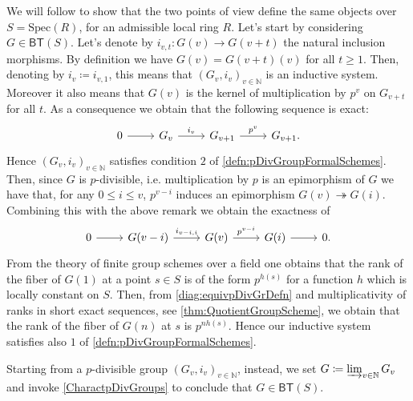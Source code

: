 \begin{rem}
	We will follow \cite[Chapter I, \S2, remark 2.3 and 
	Chapter II, \S3, theorem 2.1.7]{Messing} to show that
	the two points of view define the same objects over $S = \mathrm{Spec}(R)$,
	for an admissible local ring $R$.
	Let's start by considering $G \in \mathsf{BT}(S)$.
	Let's denote by $i_{v,t}\colon G(v) \to G(v+t)$ the natural inclusion
	morphisms.
	By definition we have $G(v) = G(v+t)(v)$ for all $t \geq 1$.
	Then, denoting by $i_v \coloneqq i_{v,1}$, this means that
	$\left( G_v, i_v \right)_{v \in \mathbb{N}}$ is an inductive system.
	Moreover it also means that $G(v)$ is the kernel of multiplication
	by $p^v$ on $G_{v+t}$ for all $t$. 
	As a consequence we obtain that the following sequence is exact:
	\begin{equation*}
	\begin{tikzcd}
		0 \arrow[r, "", rightarrow] &
		G_v \arrow[r, "i_v", rightarrow] &
		G_{v+1} \arrow[r, "p^v", rightarrow] &
		G_{v+1}
	.\end{tikzcd}
	\end{equation*}
	Hence $\left( G_v, i_v \right)_{v \in \mathbb{N}}$ satisfies condition $2$
	of \cref{defn:pDivGroupFormalSchemes}.
	Then, since $G$ is $p$-divisible, i.e. multiplication by $p$ is an
	epimorphism of $G$ we have that, for any $0 \leq i \leq v$,
	$p^{v-i}$ induces an epimorphism $G(v) \twoheadrightarrow G(i)$.
	Combining this with the above remark we obtain the exactness of
	\begin{equation}\label{diag:equivpDivGrDefn}
	\begin{tikzcd}
		0 \arrow[r, "", rightarrow] &
		G(v-i) \arrow[r, "i_{v-i,i}", rightarrow] &
		G(v) \arrow[r, "p^{v-i}", rightarrow] &
		G(i) \arrow[r, "", rightarrow] &
		0
	.\end{tikzcd}
	\end{equation}
	From the theory of finite group schemes over a field one obtains that the
	rank of the fiber of $G(1)$ at a point $s \in S$ is of the form
	$p^{h(s)}$ for a function $h$ which is locally constant on $S$.
	Then, from \cref{diag:equivpDivGrDefn} and multiplicativity of
	ranks in short exact sequences, see \cref{thm:QuotientGroupScheme}, we obtain
	that the rank of the fiber of $G(n)$ at $s$
	is $p^{nh(s)}$.
	Hence our inductive system satisfies also $1$ 
	of \cref{defn:pDivGroupFormalSchemes}.

	Starting from a $p$-divisible group $\left( G_v, i_v \right)_{v \in \mathbb{N}}$,
	instead, we set $G \coloneqq \varinjlim_{v \in \mathbb{N}} G_v$
	and invoke \cref{CharactpDivGroups} to conclude that $G \in \mathsf{BT}(S)$.
\end{rem}

